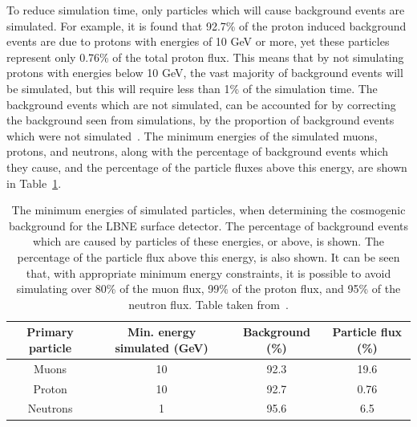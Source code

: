 To reduce simulation time, only particles which will cause background events are simulated. For example, it is found that 92.7\% of the proton induced background events are due to protons with energies of 10 GeV or more, yet these particles represent only 0.76\% of the total proton flux. This means that by not simulating protons with energies below 10 GeV, the vast majority of background events will be simulated, but this will require less than 1\% of the simulation time. The background events which are not simulated, can be accounted for by correcting the background seen from simulations, by the proportion of background events which were not simulated~\citep{MartinsThesis}. The minimum energies of the simulated muons, protons, and neutrons, along with the percentage of background events which they cause, and the percentage of the particle fluxes above this energy, are shown in Table~\ref{tab:SurfEnPrim}. \\

\begin{table}
  \caption[The minimum energies of simulated particles, when determining the cosmogenic background for the LBNE surface detector]
          {The minimum energies of simulated particles, when determining the cosmogenic background for the LBNE surface detector. The percentage of background events which are caused by particles of these energies, or above, is shown. The percentage of the particle flux above this energy, is also shown. It can be seen that, with appropriate minimum energy constraints, it is possible to avoid simulating over 80\% of the muon flux, 99\% of the proton flux, and 95\% of the neutron flux. Table taken from~\citep{MartinsThesis}.}
  \centering
  \label{tab:SurfEnPrim}
  \begin{tabular}{c c c c}
    \toprule
        {Primary particle} & {Min. energy simulated (GeV)} & {Background (\%)} & {Particle flux (\%)} \\ 
        \midrule
        Muons              & 10                            & 92.3              & 19.6                 \\

        Proton             & 10                            & 92.7              & 0.76                 \\

        Neutrons           & 1                             & 95.6              & 6.5                  \\
    \bottomrule
  \end{tabular}
\end{table}

